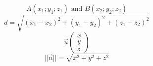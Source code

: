 \documentclass{article}
\begin{document}
\noindent
\[A(x_1;y_1;z_1)\text{ and } B(x_2;y_2;z_2)\] 
\[d = \sqrt{(x_1-x_2)^2+(y_1-y_2)^2+(z_1-z_2)^2}\]
\vspace{5mm}
\[\vec{u} \begin{pmatrix} x \\ y \\ z \end{pmatrix}\]
\[ ||\vec{u}|| = \sqrt{x^2+y^2+z^2}\]
\end{document}
